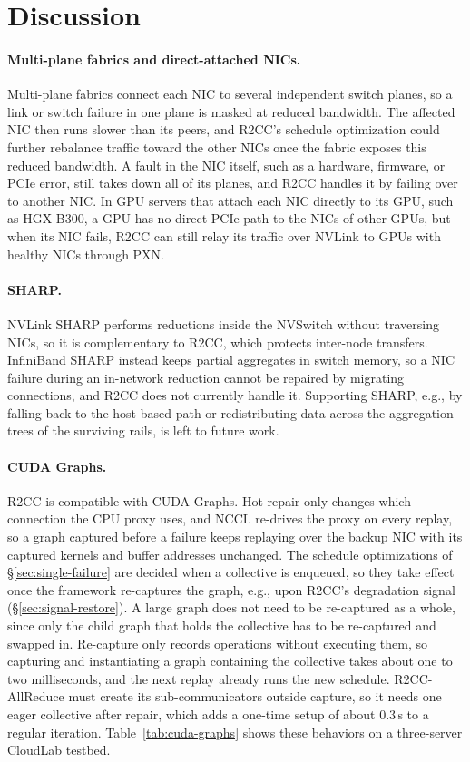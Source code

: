 \documentclass[letterpaper,twocolumn,10pt]{article}
\begin{document}
\section{Discussion}\label{app:discussion}
\paragraph{Multi-plane fabrics and direct-attached NICs.} Multi-plane fabrics connect each NIC to several independent switch planes, so a link or switch failure in one plane is masked at reduced bandwidth. The affected NIC then runs slower than its peers, and R2CC's schedule optimization could further rebalance traffic toward the other NICs once the fabric exposes this reduced bandwidth. A fault in the NIC itself, such as a hardware, firmware, or PCIe error, still takes down all of its planes, and R2CC handles it by failing over to another NIC. In GPU servers that attach each NIC directly to its GPU, such as HGX B300, a GPU has no direct PCIe path to the NICs of other GPUs, but when its NIC fails, R2CC can still relay its traffic over NVLink to GPUs with healthy NICs through PXN.

\paragraph{SHARP.} NVLink SHARP performs reductions inside the NVSwitch without traversing NICs, so it is complementary to R2CC, which protects inter-node transfers. InfiniBand SHARP instead keeps partial aggregates in switch memory, so a NIC failure during an in-network reduction cannot be repaired by migrating connections, and R2CC does not currently handle it. Supporting SHARP, e.g., by falling back to the host-based path or redistributing data across the aggregation trees of the surviving rails, is left to future work.

\paragraph{CUDA Graphs.} R2CC is compatible with CUDA Graphs. Hot repair only changes which connection the CPU proxy uses, and NCCL re-drives the proxy on every replay, so a graph captured before a failure keeps replaying over the backup NIC with its captured kernels and buffer addresses unchanged. The schedule optimizations of \S\ref{sec:single-failure} are decided when a collective is enqueued, so they take effect once the framework re-captures the graph, e.g., upon R2CC's degradation signal (\S\ref{sec:signal-restore}). A large graph does not need to be re-captured as a whole, since only the child graph that holds the collective has to be re-captured and swapped in. Re-capture only records operations without executing them, so capturing and instantiating a graph containing the collective takes about one to two milliseconds, and the next replay already runs the new schedule. R2CC-AllReduce must create its sub-communicators outside capture, so it needs one eager collective after repair, which adds a one-time setup of about 0.3\,s to a regular iteration. Table~\ref{tab:cuda-graphs} shows these behaviors on a three-server CloudLab testbed.
\end{document}
